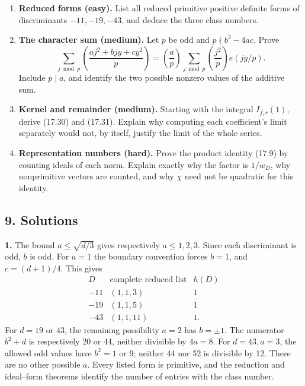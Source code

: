 \documentclass[
  11pt,
  a4paper,
]{article}
\providecommand{\tightlist}{%
  \setlength{\itemsep}{0pt}\setlength{\parskip}{0pt}}
\begin{document}
\begin{enumerate}
\def\labelenumi{\arabic{enumi}.}
\tightlist
\item
  \textbf{Reduced forms (easy).} List all reduced primitive positive
  definite forms of discriminants \(-11,-19,-43\), and deduce the three
  class numbers.
\item
  \textbf{The character sum (medium).} Let \(p\) be odd and
  \(p\nmid b^2-4ac\). Prove \[
   \sum_{j\bmod p}\left(\frac{aj^2+bjy+cy^2}{p}\right)
   =\left(\frac ap\right)
      \sum_{j\bmod p}\left(\frac{j^2}{p}\right)e(jy/p).
  \] Include \(p\mid a\), and identify the two possible nonzero values
  of the additive sum.
\item
  \textbf{Kernel and remainder (medium).} Starting with the integral
  \(I_{f,r}(1)\), derive (17.30) and (17.31). Explain why computing each
  coefficient's limit separately would not, by itself, justify the limit
  of the whole series.
\item
  \textbf{Representation numbers (hard).} Prove the product identity
  (17.9) by counting ideals of each norm. Explain exactly why the factor
  is \(1/w_D\), why nonprimitive vectors are counted, and why \(\chi\)
  need not be quadratic for this identity.
\end{enumerate}

\subsection{9. Solutions}\label{solutions}

\textbf{1.} The bound \(a\le\sqrt{d/3}\) gives respectively
\(a\le1,2,3\). Since each discriminant is odd, \(b\) is odd. For \(a=1\)
the boundary convention forces \(b=1\), and \(c=(d+1)/4\). This gives \[
 \begin{array}{c|c|c}
 D&\text{complete reduced list}&h(D)\\\hline
 -11&(1,1,3)&1\\
 -19&(1,1,5)&1\\
 -43&(1,1,11)&1.
 \end{array}
\] For \(d=19\) or \(43\), the remaining possibility \(a=2\) has
\(b=\pm1\). The numerator \(b^2+d\) is respectively 20 or 44, neither
divisible by \(4a=8\). For \(d=43,a=3\), the allowed odd values have
\(b^2=1\) or 9; neither 44 nor 52 is divisible by 12. There are no other
possible \(a\). Every listed form is primitive, and the reduction and
ideal--form theorems identify the number of entries with the class
number.
\end{document}
